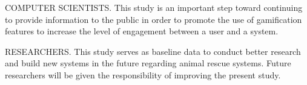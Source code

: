 COMPUTER SCIENTISTS. This study is an important step toward continuing
to provide information to the public in order to promote the use of gamification
features to increase the level of engagement between a user and a system.

RESEARCHERS. This study serves as baseline data to conduct better research
and build new systems in the future regarding animal rescue systems. Future
researchers will be given the responsibility of improving the present study.
%
%



